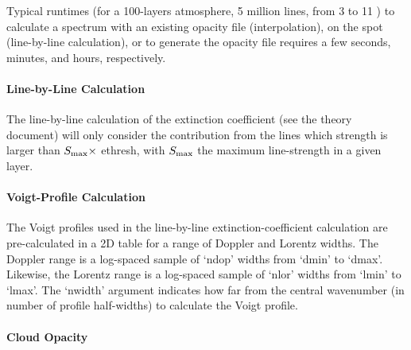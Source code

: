 \documentclass[letterpaper, 12pt]{article}
\begin{document}

Typical runtimes (for a 100-layers atmosphere, 5 million lines, from 3
to 11 {\microns}) to calculate a spectrum with an existing opacity
file (interpolation), on the spot (line-by-line calculation), or to
generate the opacity file requires a few seconds, minutes, and hours,
respectively.

\paragraph{Line-by-Line Calculation}

The line-by-line calculation of the extinction coefficient (see the
theory document) will only consider the contribution from the lines
which strength is larger than $S\sb{\rm max} \times$ {\tttb ethresh},
with $S\sb{\rm max}$ the maximum line-strength in a given layer.

\paragraph{Voigt-Profile Calculation}

The Voigt profiles used in the line-by-line extinction-coefficient
calculation are pre-calculated in a 2D table for a range of
Doppler and Lorentz widths.  The Doppler range is a log-spaced sample
of `{\tttb ndop}' widths from `{\tttb dmin}' to `{\tttb dmax}'.
Likewise, the Lorentz range is a log-spaced sample
of `{\tttb nlor}' widths from `{\tttb lmin}' to `{\tttb lmax}'.
The `{\tttm nwidth}' argument indicates how far from the central
wavenumber (in number of profile half-widths) to calculate the Voigt
profile.

\paragraph{Cloud Opacity}
\end{document}

